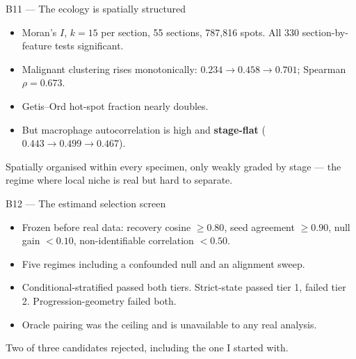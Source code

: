 \documentclass[aspectratio=169,10pt]{beamer}
\begin{document}
\begin{frame}{B11 --- The ecology is spatially structured}
  \begin{itemize}\small
    \item Moran's $I$, $k=15$ per section, 55 sections, 787,816 spots. All 330
          section-by-feature tests significant.
    \item Malignant clustering rises monotonically:
          $0.234 \rightarrow 0.458 \rightarrow 0.701$; Spearman $\rho=0.673$.
    \item Getis--Ord hot-spot fraction nearly doubles.
    \item But macrophage autocorrelation is high and \textbf{stage-flat}
          ($0.443 \rightarrow 0.499 \rightarrow 0.467$).
  \end{itemize}
  \vfill\begin{center}\small Spatially organised within every specimen, only weakly
  graded by stage --- the regime where local niche is real but hard to
  separate.\end{center}
\end{frame}

\begin{frame}{B12 --- The estimand selection screen}
  \begin{itemize}\small
    \item Frozen before real data: recovery cosine $\ge0.80$, seed agreement
          $\ge0.90$, null gain $<0.10$, non-identifiable correlation $<0.50$.
    \item Five regimes including a confounded null and an alignment sweep.
    \item Conditional-stratified passed both tiers. Strict-state passed tier 1,
          failed tier 2. Progression-geometry failed both.
    \item Oracle pairing was the ceiling and is unavailable to any real analysis.
  \end{itemize}
  \vfill\begin{center}\small Two of three candidates rejected, including the one I
  started with.\end{center}
\end{frame}
\end{document}
